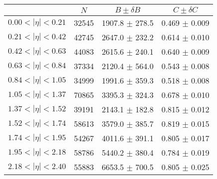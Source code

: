 \begin{tabular}{lccc}
\hline
    &   $N$   & $B \pm \delta B$  &  $C \pm \delta C$ \\
\hline
$0.00 < |\eta| <0.21$          & 32545      & 1907.8     $\pm$ 278.5 & 0.469      $\pm$ 0.009 \\
$0.21 < |\eta| <0.42$          & 42745      & 2647.0     $\pm$ 232.2 & 0.614      $\pm$ 0.010 \\
$0.42 < |\eta| <0.63$          & 44083      & 2615.6     $\pm$ 240.1 & 0.640      $\pm$ 0.009 \\
$0.63 < |\eta| <0.84$          & 37334      & 2120.4     $\pm$ 564.0 & 0.543      $\pm$ 0.008 \\
$0.84 < |\eta| <1.05$          & 34999      & 1991.6     $\pm$ 359.3 & 0.518      $\pm$ 0.008 \\
$1.05 < |\eta| <1.37$          & 70865      & 3395.3     $\pm$ 324.3 & 0.678      $\pm$ 0.010 \\
$1.37 < |\eta| <1.52$          & 39191      & 2143.1     $\pm$ 182.8 & 0.815      $\pm$ 0.012 \\
$1.52 < |\eta| <1.74$          & 58613      & 3579.0     $\pm$ 385.7 & 0.819      $\pm$ 0.015 \\
$1.74 < |\eta| <1.95$          & 54267      & 4011.6     $\pm$ 391.1 & 0.805      $\pm$ 0.017 \\
$1.95 < |\eta| <2.18$          & 58786      & 5440.2     $\pm$ 380.4 & 0.784      $\pm$ 0.019 \\
$2.18 < |\eta| <2.40$          & 55883      & 6653.5     $\pm$ 700.5 & 0.805      $\pm$ 0.025 \\
\hline
\end{tabular}
